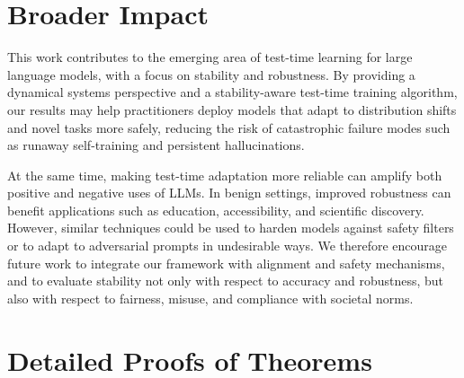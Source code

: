 \documentclass{article}
\theoremstyle{plain}
\theoremstyle{definition}
\theoremstyle{remark}
\begin{document}
\section*{Broader Impact}

This work contributes to the emerging area of test-time learning for large language models, with a focus on stability and robustness. By providing a dynamical systems perspective and a stability-aware test-time training algorithm, our results may help practitioners deploy models that adapt to distribution shifts and novel tasks more safely, reducing the risk of catastrophic failure modes such as runaway self-training and persistent hallucinations.

At the same time, making test-time adaptation more reliable can amplify both positive and negative uses of LLMs. In benign settings, improved robustness can benefit applications such as education, accessibility, and scientific discovery. However, similar techniques could be used to harden models against safety filters or to adapt to adversarial prompts in undesirable ways. We therefore encourage future work to integrate our framework with alignment and safety mechanisms, and to evaluate stability not only with respect to accuracy and robustness, but also with respect to fairness, misuse, and compliance with societal norms.





\clearpage
\appendix
\onecolumn

\section{Detailed Proofs of Theorems}
\label{app:proofs}
\end{document}

